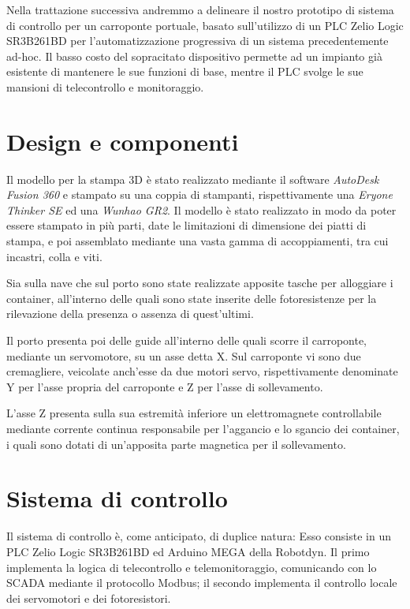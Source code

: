Nella trattazione successiva andremmo a delineare il nostro prototipo di sistema di
controllo per un carroponte portuale, basato sull'utilizzo di un PLC Zelio Logic SR3B261BD per
l'automatizzazione progressiva di un sistema precedentemente ad-hoc. Il basso costo del sopracitato
dispositivo permette ad un impianto già esistente di mantenere le sue funzioni di base, mentre il
PLC svolge le sue mansioni di telecontrollo e monitoraggio.


\section{Design e componenti}

Il modello per la stampa 3D è stato realizzato mediante il software \emph{AutoDesk Fusion 360} e
stampato su una coppia di stampanti, rispettivamente una \emph{Eryone Thinker SE} ed una
\emph{Wunhao GR2}. Il modello è stato realizzato in modo da poter essere stampato in più parti, date
le limitazioni di dimensione dei piatti di stampa, e poi assemblato mediante una vasta gamma di
accoppiamenti, tra cui incastri, colla e viti.

Sia sulla nave che sul porto sono state realizzate apposite tasche per alloggiare i container,
all'interno delle quali sono state inserite delle fotoresistenze per la rilevazione della presenza o
assenza di quest'ultimi.

Il porto presenta poi delle guide all'interno delle quali scorre il carroponte, mediante un
servomotore, su un asse detta X. Sul carroponte vi sono due cremagliere, veicolate anch'esse da due
motori servo, rispettivamente denominate Y per l'asse propria del carroponte e Z per l'asse di
sollevamento.

L'asse Z presenta sulla sua estremità inferiore un elettromagnete controllabile mediante corrente
continua responsabile per l'aggancio e lo sgancio dei container, i quali sono dotati di un'apposita
parte magnetica per il sollevamento.

\section{Sistema di controllo}

Il sistema di controllo è, come anticipato, di duplice natura: Esso consiste in un PLC Zelio Logic
SR3B261BD ed Arduino MEGA della Robotdyn. Il primo implementa la logica di telecontrollo e
telemonitoraggio, comunicando con lo SCADA mediante il protocollo Modbus; il secondo implementa il
controllo locale dei servomotori e dei fotoresistori.

